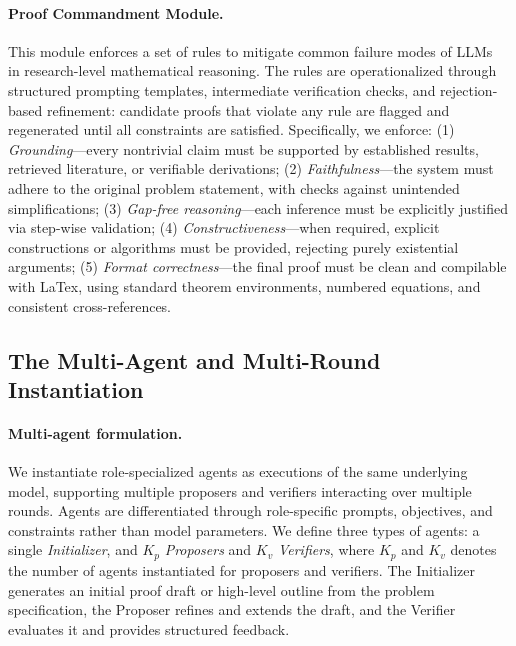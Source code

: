 \documentclass{article}
\newcommand{\modelname}{\textsc{RMA}\xspace}
\begin{document}
\paragraph{Proof Commandment Module.}
This module enforces a set of rules to mitigate common failure modes of LLMs~\citep{ji2023towards,zimmer2026agenticresearcherpracticalguide} in research-level mathematical reasoning. The rules are operationalized through structured prompting templates, intermediate verification checks, and rejection-based refinement: candidate proofs that violate any rule are flagged and regenerated until all constraints are satisfied. Specifically, we enforce: 
(1) \emph{Grounding}—every nontrivial claim must be supported by established results, retrieved literature, or verifiable derivations; 
(2) \emph{Faithfulness}—the system must adhere to the original problem statement, with checks against unintended simplifications; 
(3) \emph{Gap-free reasoning}—each inference must be explicitly justified via step-wise validation; 
(4) \emph{Constructiveness}—when required, explicit constructions or algorithms must be provided, rejecting purely existential arguments; 
(5) \emph{Format correctness}—the final proof must be clean and compilable with LaTex, using standard theorem environments, numbered equations, and consistent cross-references.

\vspace{-7pt}
\subsection{The Multi-Agent and Multi-Round Instantiation}
\vspace{-7pt}
\paragraph{Multi-agent formulation.}
We instantiate role-specialized agents as executions of the same underlying model, supporting multiple proposers and verifiers interacting over multiple rounds. Agents are differentiated through role-specific prompts, objectives, and constraints rather than model parameters. We define three types of agents: a single \emph{Initializer}, and $K_p$ \emph{Proposers} and $K_v$ \emph{Verifiers}, where $K_p$ and $K_v$ denotes the number of agents instantiated for proposers and verifiers. The Initializer generates an initial proof draft or high-level outline from the problem specification, the Proposer refines and extends the draft, and the Verifier evaluates it and provides structured feedback.
\vspace{-7pt}
\end{document}
